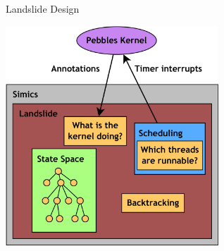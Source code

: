 \documentclass[xcolor=dvipsnames]{beamer}
\begin{document}
\begin{frame}{Landslide Design}
	\begin{center}
		\includegraphics[width=0.6\textwidth]{landslide.pdf}
	\end{center}
\end{frame}
\end{document}
